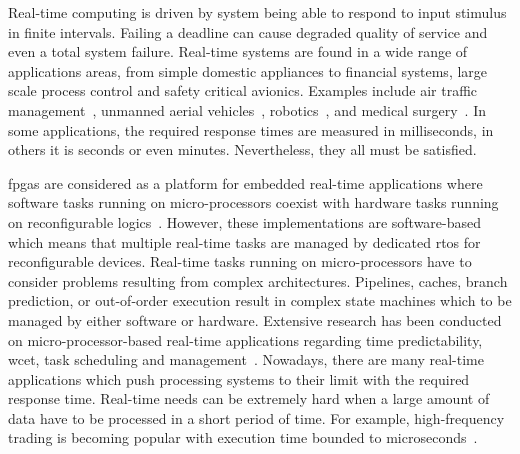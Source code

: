 Real-time computing is driven by system being able to respond to input stimulus in finite intervals.
Failing a deadline can cause degraded quality of service and even a total system failure.
Real-time systems are found in a wide range of applications areas, from simple domestic appliances to financial systems, large scale process control and safety critical avionics.
Examples include air traffic management~\cite{crisostomi07,eele11}, unmanned aerial vehicles~\cite{ortiz06}, robotics~\cite{dellaert99}, and medical surgery~\cite{kwok10}.
In some applications, the required response times are measured in milliseconds, in others it is seconds or even minutes. 
Nevertheless, they all must be satisfied.

\glspl{fpga} are considered as a platform for embedded real-time applications where software tasks running on micro-processors coexist with hardware tasks running on reconfigurable logics~\cite{paul12,schoeberl08,whitham09,alteradoc}.
However, these implementations are software-based which means that multiple real-time tasks are managed by dedicated \gls{rtos} for reconfigurable devices.
Real-time tasks running on micro-processors have to consider problems resulting from complex architectures.
Pipelines, caches, branch prediction, or out-of-order execution result in complex state machines which to be managed by either software or hardware.
Extensive research has been conducted on micro-processor-based real-time applications regarding time predictability, \gls{wcet}, task scheduling and management~\cite{burns01,davis11,puschner00}.
Nowadays, there are many real-time applications which push processing systems to their limit with the required response time.
Real-time needs can be extremely hard when a large amount of data have to be processed in a short period of time.
For example, high-frequency trading is becoming popular with execution time bounded to microseconds~\cite{mcgowan10}. 

